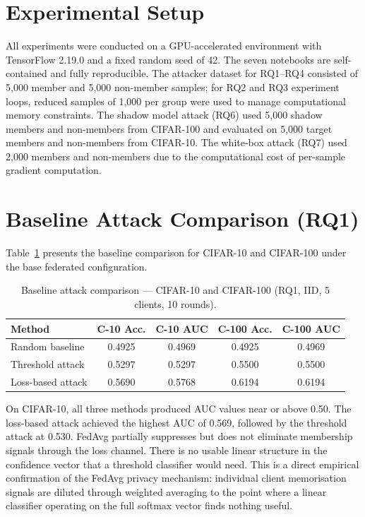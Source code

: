 \documentclass[12pt, a4paper]{report}
\begin{document}
\section{Experimental Setup}

All experiments were conducted on a GPU-accelerated environment with TensorFlow
2.19.0 and a fixed random seed of 42. The seven notebooks are self-contained and
fully reproducible. The attacker dataset for RQ1--RQ4 consisted of 5,000 member
and 5,000 non-member samples; for RQ2 and RQ3 experiment loops, reduced samples
of 1,000 per group were used to manage computational memory constraints.
The shadow model attack (RQ6) used 5,000 shadow members and non-members from
CIFAR-100 and evaluated on 5,000 target members and non-members from CIFAR-10.
The white-box attack (RQ7) used 2,000 members and non-members due to the
computational cost of per-sample gradient computation.

\section{Baseline Attack Comparison (RQ1)}

Table~\ref{tab:baseline} presents the baseline comparison for CIFAR-10 and
CIFAR-100 under the base federated configuration.

\begin{table}[H]
  \centering
  \caption{Baseline attack comparison --- CIFAR-10 and CIFAR-100 (RQ1, IID, 5 clients, 10 rounds).}
  \label{tab:baseline}
  \begin{tabular}{lcccc}
    \toprule
    \textbf{Method} & \textbf{C-10 Acc.} & \textbf{C-10 AUC} & \textbf{C-100 Acc.} & \textbf{C-100 AUC} \\
    \midrule
    Random baseline                    & 0.4925 & 0.4969 & 0.4925 & 0.4969 \\
    Threshold attack                   & 0.5297 & 0.5297 & 0.5500 & 0.5500 \\
    Loss-based attack                  & 0.5690 & 0.5768 & 0.6194 & 0.6194 \\
    \bottomrule
  \end{tabular}
\end{table}

On CIFAR-10, all three methods produced AUC values near or above 0.50. The loss-based
attack achieved the highest AUC of 0.569, followed by the threshold attack at
0.530. FedAvg partially suppresses but does not eliminate membership signals
through the loss channel. There is no usable linear structure
in the confidence vector that a threshold classifier would need. This is a direct
empirical confirmation of the FedAvg privacy mechanism: individual client
memorisation signals are diluted through weighted averaging to the point where
a linear classifier operating on the full softmax vector finds nothing useful.
\end{document}
